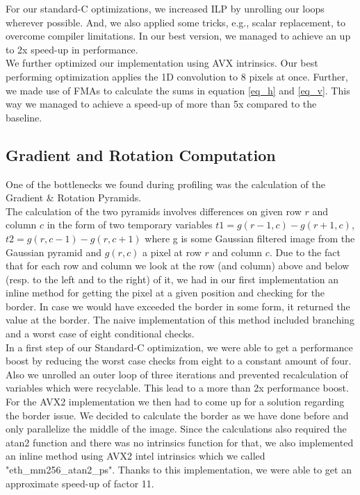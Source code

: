\documentclass[letterpaper]{article}
\begin{document}
For our standard-C optimizations, we increased ILP by unrolling our loops wherever possible. And, we also applied some tricks, e.g., scalar replacement, to overcome compiler limitations. In our best version, we managed to achieve an up to 2x speed-up in performance.\\

We further optimized our implementation using AVX intrinsics. Our best performing optimization applies the 1D convolution to 8 pixels at once. Further, we made use of FMAs to calculate the sums in equation \ref{eq_h} and \ref{eq_v}. This way we managed to achieve a speed-up of more than 5x compared to the baseline.


\subsection*{Gradient and Rotation Computation}
One of the bottlenecks we found during profiling was the calculation of the Gradient \& Rotation Pyramids. \\

The calculation of the two pyramids involves differences on given row $r$ and column $c$ in the form of two temporary variables $t1 = g(r-1,c) - g(r+1, c)$, $t2 = g(r,c-1) - g(r, c+1)$ where g is some Gaussian filtered image from the Gaussian pyramid and $g(r,c)$ a pixel at row $r$ and column $c$.
Due to the fact that for each row and column we look at the row (and column) above and below (resp. to the left and to the right) of it, we had in our first implementation an inline method for getting the pixel at a given position and checking for the border. In case we would have exceeded the border in some form, it returned the value at the border. The naive implementation of this method included branching and a worst case of eight conditional checks. \\

In a first step of our Standard-C optimization, we were able to get a performance boost by reducing the worst case checks from eight to a constant amount of four. Also we unrolled an outer loop of three iterations and prevented recalculation of variables which were recyclable. This lead to a more than 2x performance boost.\\

For the AVX2 implementation we then had to come up for a solution regarding the border issue. We decided to calculate the border as we have done before and only parallelize the middle of the image. Since the calculations also required the atan2 function and there was no intrinsics function for that, we also implemented an inline method using AVX2 intel intrinsics which we called "eth\_mm256\_atan2\_ps". Thanks to this implementation, we were able to get an approximate speed-up of factor 11.
\end{document}
